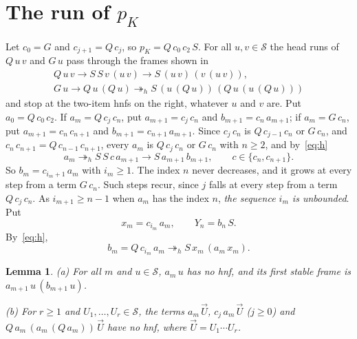 \documentclass[11pt]{amsart}
\newtheorem{lemma}[theorem]{Lemma}
\theoremstyle{definition}
\newcommand{\Ter}{\mathcal S}
\newcommand{\hred}{\twoheadrightarrow_h}
\newcommand{\pK}{p_K}
\newcommand{\vU}{\vec U}
\begin{document}
\section{The run of \texorpdfstring{$p_K$}{pK}}\label{sec:pk}

Let $c_0=G$ and $c_{j+1}=Q\,c_j$, so $\pK=Q\,c_0\,c_2\,S$. For all $u,v\in\Ter$ the head runs of $Q\,u\,v$ and $G\,u$
pass through the frames shown in
\begin{equation}\label{eq:h}
\begin{gathered}
Q\,u\,v\to S\,S\,v\,(u\,v)\to S\,(u\,v)\,(v\,(u\,v)),\\
G\,u\to Q\,u\,(Q\,u)\hred S\,(u\,(Q\,u))\,(Q\,u\,(u\,(Q\,u)))
\end{gathered}
\end{equation}
and stop at the two-item hnfs on the right, whatever $u$ and $v$ are. Put $a_0=Q\,c_0\,c_2$. If $a_m=Q\,c_j\,c_n$, put $a_{m+1}=c_j\,c_n$ and
$b_{m+1}=c_n\,a_{m+1}$; if $a_m=G\,c_n$, put $a_{m+1}=c_n\,c_{n+1}$ and
$b_{m+1}=c_{n+1}\,a_{m+1}$. Since $c_j\,c_n$ is $Q\,c_{j-1}\,c_n$ or $G\,c_n$, and $c_n\,c_{n+1}=Q\,c_{n-1}\,c_{n+1}$,
every $a_m$ is $Q\,c_j\,c_n$ or $G\,c_n$ with $n\ge2$, and by~\eqref{eq:h}
\begin{equation}\label{eq:am}
a_m\hred S\,S\,c\,a_{m+1}\to S\,a_{m+1}\,b_{m+1},\qquad c\in\{c_n,c_{n+1}\}.
\end{equation}
So $b_m=c_{i_m+1}\,a_m$ with $i_m\ge1$. The index $n$ never decreases, and it grows at every step
from a term $G\,c_n$. Such steps recur, since $j$ falls at every step from a term $Q\,c_j\,c_n$. As
$i_{m+1}\ge n-1$ when $a_m$ has the index $n$, \emph{the sequence $i_m$ is unbounded}. Put
\[
x_m=c_{i_m}\,a_m,\qquad Y_n=b_n\,S.
\]
By~\eqref{eq:h},
\begin{equation}\label{eq:bm}
b_m=Q\,c_{i_m}\,a_m\hred S\,x_m\,(a_m\,x_m).
\end{equation}

\begin{lemma}\label{lem:pk}
\textup{(a)} For all $m$ and $u\in\Ter$, $a_m\,u$ has no hnf, and its first stable frame is
$a_{m+1}\,u\,(b_{m+1}\,u)$.

\textup{(b)} For $r\ge1$ and $U_1,\dots,U_r\in\Ter$, the terms $a_m\,\vU$, $c_j\,a_m\,\vU$
\textup{(}$j\ge0$\textup{)} and $Q\,a_m\,(a_m\,(Q\,a_m))\,\vU$ have no hnf, where
$\vU=U_1\cdots U_r$.
\end{lemma}
\end{document}
